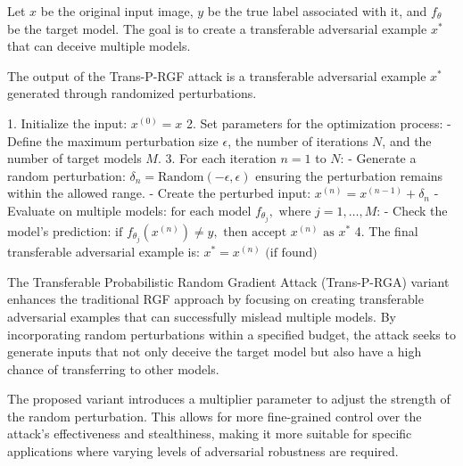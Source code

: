Let $x$ be the original input image, $y$ be the true label associated with it, and $f_{\theta}$ be the target model. The goal is to create a transferable adversarial example $x^*$ that can deceive multiple models.

The output of the Trans-P-RGF attack is a transferable adversarial example $x^*$ generated through randomized perturbations.

1. Initialize the input:
   $x^{(0)} = x$
2. Set parameters for the optimization process:
   - Define the maximum perturbation size $\epsilon$, the number of iterations $N$, and the number of target models $M$.
3. For each iteration $n = 1$ to $N$:
   - Generate a random perturbation:
   $\delta_n = \text{Random}(-\epsilon, \epsilon)$
   ensuring the perturbation remains within the allowed range.
   - Create the perturbed input:
   $x^{(n)} = x^{(n-1)} + \delta_n$
   - Evaluate on multiple models:
   $\text{for each model } f_{\theta_j}, \text{ where } j = 1, \ldots, M$:
   - Check the model's prediction:
   $\text{if } f_{\theta_j}(x^{(n)}) \neq y, \text{ then accept } x^{(n)} \text{ as } x^*$
4. The final transferable adversarial example is:
   $x^* = x^{(n)} \text{ (if found)}$

The Transferable Probabilistic Random Gradient Attack (Trans-P-RGA) variant enhances the traditional RGF approach by focusing on creating transferable adversarial examples that can successfully mislead multiple models. By incorporating random perturbations within a specified budget, the attack seeks to generate inputs that not only deceive the target model but also have a high chance of transferring to other models.

The proposed variant introduces a multiplier parameter to adjust the strength of the random perturbation. This allows for more fine-grained control over the attack's effectiveness and stealthiness, making it more suitable for specific applications where varying levels of adversarial robustness are required.
